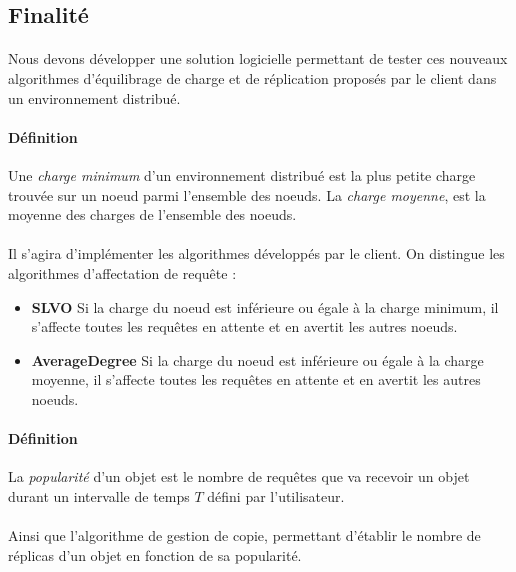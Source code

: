 \documentclass[12pt]{article}
\begin{document}

\subsection{Finalité}

\paragraph{} Nous devons développer une solution logicielle permettant de tester ces nouveaux algorithmes d'équilibrage de charge et de réplication proposés par le client dans un environnement distribué.

\paragraph{Définition} Une \textit{charge minimum} d'un environnement distribué est la plus petite charge trouvée sur un noeud parmi l'ensemble des noeuds. La \textit{charge moyenne}, est la moyenne des charges de l'ensemble des noeuds.

\paragraph{}Il s'agira d'implémenter les algorithmes développés par le client.
On distingue les algorithmes d'affectation de requête :

\begin{itemize}
 \item \textbf{SLVO} 
    Si la charge du noeud est inférieure ou égale à la charge minimum, il s'affecte toutes les requêtes en attente et en avertit les autres noeuds.
 \item \textbf{AverageDegree}
    Si la charge du noeud est inférieure ou égale à la charge moyenne, il s'affecte toutes les requêtes en attente et en avertit les autres noeuds.
\end{itemize}

\paragraph{Définition} La \textit{popularité} d'un objet est le nombre de requêtes que va recevoir un objet durant un intervalle de temps $T$ défini par l'utilisateur.

\paragraph{}Ainsi que l'algorithme de gestion de copie, permettant d'établir le nombre de réplicas d'un objet en fonction de sa popularité.
\end{document}
